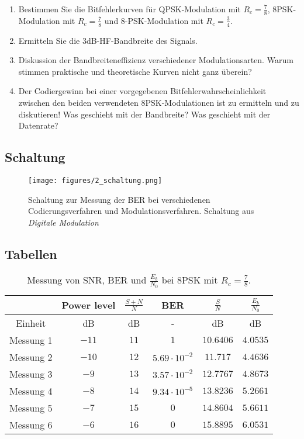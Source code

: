 \documentclass[12pt,a4paper,ngerman]{article}
\begin{document}
\begin{enumerate}
\item Bestimmen Sie die Bitfehlerkurven für QPSK-Modulation mit $R_c = \frac{7}{8}$, 8PSK-Modulation mit $R_c = \frac{7}{8}$ und 8-PSK-Modulation mit $R_c = \frac{3}{4}$.
\item Ermitteln Sie die 3dB-HF-Bandbreite des Signals.
\item Diskussion der Bandbreiteneffizienz verschiedener Modulationsarten. Warum stimmen praktische und theoretische Kurven nicht ganz überein?
\item Der Codiergewinn bei einer vorgegebenen Bitfehlerwahrscheinlichkeit zwischen den beiden verwendeten 8PSK-Modulationen ist zu ermitteln und zu diskutieren! Was geschieht mit der Bandbreite? Was geschieht mit der Datenrate?
\end{enumerate}





\subsection{Schaltung}
\begin{figure}[h!]
\centering
\texttt{[image: figures/2\_schaltung.png]} 
\caption{Schaltung zur Messung der BER bei verschiedenen Codierungsverfahren und Modulationsverfahren. Schaltung aus \emph{Digitale Modulation}\cite[S.25]{2_schematic}}
	\label{fig:qpsk_8psk_ber}
	\end{figure}
	
\subsection{Tabellen}

\begin{center}
\begin{table}[h!]


\centering
\begin{tabular}{ |c|c|c|c|c|c| }
  \hline
    & Power level & $\frac{S+N}{N}$ & BER & $\frac{S}{N}$ & $\frac{E_b}{N_0}$\\
  \hline
  Einheit & dB & dB & - & dB & dB \\
  \hline
  Messung 1 & $-11$ & $11$ & $1$ & $10.6406$ & $4.0535$ \\
  \hline
    Messung 2 & $-10$ & $12$ & $5.69\cdot10^{-2}$ & $11.717$ & $4.4636$ \\
  \hline
    Messung 3 & $-9$ & $13$ & $3.57\cdot10^{-2}$ & $12.7767$ & $4.8673$ \\
  \hline
    Messung 4 & $-8$ & $14$ & $9.34\cdot10^{-5}$ & $13.8236$ & $5.2661$ \\
  \hline
    Messung 5 & $-7$ & $15$ & $0$ & $14.8604$ & $5.6611$ \\
  \hline
    Messung 6 & $-6$ & $16$ & $0$ & $15.8895$ & $6.0531$ \\
  \hline    
\end{tabular}
\caption{Messung von SNR, BER und $\frac{E_b}{N_0}$ bei 8PSK mit $R_c = \frac{7}{8}$.\label{tab:8psk_7_8}}
\end{table}

\end{center}
\end{document}
